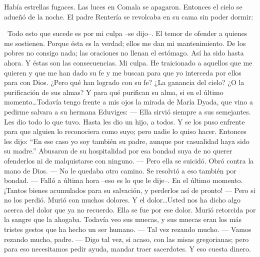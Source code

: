   Había estrellas fugaces. Las luces en Comala se apagaron.
\pend
%
\pstart
  Entonces el cielo se adueñó de la noche.
\pend
%
\pstart
  El padre Rentería se revolcaba en su cama sin poder dormir:

  \guillemotleft Todo esto que sucede es por mi culpa --se dijo--. El temor de ofender a quienes me sostienen. Porque ésta es la verdad; ellos me dan mi mantenimiento. De los pobres no consigo nada; las oraciones no llenan el estómago. Así ha sido hasta ahora. Y éstas son las consecuencias. Mi culpa. He traicionado a aquellos que me quieren y que me han dado su fe y me buscan para que yo interceda por ellos para con Dios. ¿Pero qué han logrado con su fe? ¿La ganancia del cielo? ¿O la purificación de sus almas? Y para qué purifican su alma, si en el último momento\ldots Todavía tengo frente a mis ojos la mirada de María Dyada, que vino a pedirme salvara a su hermana Eduviges:
\pend
%
\pstart
  \guillemotright --- Ella sirvió siempre a sus semejantes. Les dio todo lo que tuvo. Hasta les dio un hijo, a todos. Y se los puso enfrente para que alguien lo reconociera como suyo; pero nadie lo quiso hacer. Entonces les dijo: ``En ese caso yo soy también su padre, aunque por casualidad haya sido su madre.'' Abusaron de su hospitalidad por esa bondad suya de no querer ofenderlos ni de malquistarse con ninguno.
\pend
%
\pstart
  \guillemotright --- Pero ella se suicidó. Obró contra la mano de Dios.
\pend
%
\pstart
  \guillemotright --- No le quedaba otro camino. Se resolvió a eso también por bondad.
\pend
%
\pstart
  \guillemotright --- Falló a última hora --eso es lo que le dije--. En el último momento.
  ¡Tantos bienes acumulados para su salvación, y perderlos así de pronto!
\pend
%
\pstart
  \guillemotright --- Pero si no los perdió. Murió con muchos dolores. Y el dolor\ldots Usted nos ha dicho algo acerca del dolor que ya no recuerdo. Ella se fue por ese dolor. Murió retorcida por la sangre que la ahogaba. Todavía veo sus muecas, y sus muecas eran los más tristes gestos que ha hecho un ser humano.
\pend
%
\pstart
  \guillemotright --- Tal vez rezando mucho.
\pend
%
\pstart
  \guillemotright --- Vamos rezando mucho, padre.
\pend
%
\pstart
  \guillemotright --- Digo tal vez, si acaso, con las misas gregorianas; pero para eso necesitamos pedir ayuda, mandar traer sacerdotes. Y eso cuesta dinero.
